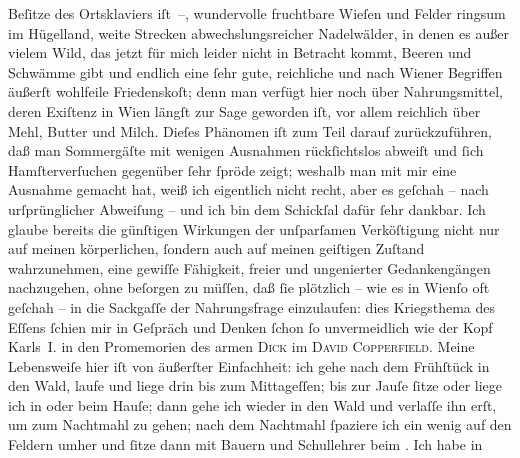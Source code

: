 \begin{ledgroupsized}[t]{13cm}
               Beſitze des Ortsklaviers iſt –, wundervolle fruchtbare Wieſen und Felder ringsum im
               Hügelland, weite Strec{\pb}ken
               abwechslungsreicher Nadelwälder, in denen es außer vielem Wild, das jetzt für mich
               leider nicht in Betracht kommt, Beeren und Schwämme gibt und endlich eine ſehr gute,
               reichliche und nach Wiener Begriffen äußerſt
               wohlfeile Friedenskoſt; denn man verfügt hier noch über Nahrungsmittel, deren
               Exiſtenz in Wien längſt zur Sage geworden iſt, vor
               allem reichlich über Mehl, Butter und Milch. Dieſes Phänomen iſt zum Teil darauf
               zurückzuführen, daß man Sommergäſte mit wenigen Ausnahmen rückſichtslos abweiſt und
               ſich Hamſterverſuchen gegenüber ſehr ſpröde zeigt; weshalb man mit mir eine Ausnahme
               gemacht hat, weiß ich eigentlich nicht recht, aber es geſchah – nach urſprünglicher
               Abweiſung – und ich bin dem Schickſal dafür ſehr dankbar. Ich glaube bereits die
               günſtigen Wirkungen der unſparſamen {\pb}Verköſtigung nicht nur auf meinen körperlichen, ſondern auch auf meinen geiſtigen
               Zuſtand wahrzunehmen, eine gewiſſe Fähigkeit, freier und ungenierter Gedankengängen
               nachzugehen, ohne beſorgen zu müſſen, daß ſie plötzlich – wie es in Wienſo oft geſchah – in die Sackgaſſe der Nahrungsfrage
               einzulaufen: dies Kriegsthema des Eſſens ſchien mir in Geſpräch und Denken ſchon ſo
               unvermeidlich wie der Kopf Karls I. in den Promemorien des armen \textsc{Dick} im \textsc{David Copperfield}.\pend
           \pstart
           Meine Lebensweiſe hier iſt von äußerſter Einfachheit: ich gehe nach dem Frühſtück in
               den Wald, laufe und liege drin bis zum Mittageſſen; bis zur Jauſe ſitze oder liege
               ich in oder beim Hauſe; dann gehe ich wieder in den Wald und verlaſſe ihn erſt, um
               zum Nachtmahl zu gehen; nach dem Nachtmahl ſpaziere ich ein wenig auf den Feldern
               umher und ſitze dann mit Bauern und Schul{\pb}lehrer beim \label{K_L02289-1v}\label{K_L02289-1h}. Ich habe in

\end{ledgroupsized}
